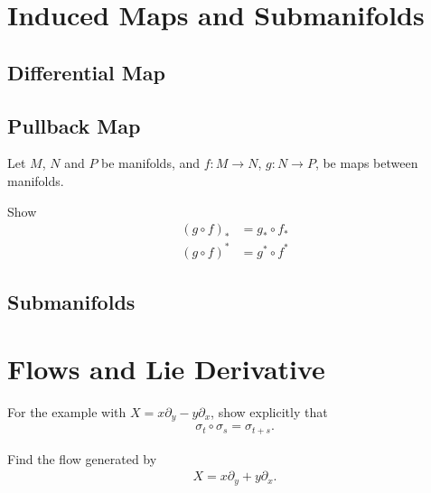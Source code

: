 \section{Induced Maps and Submanifolds}

\subsection{Differential Map}

\subsection{Pullback Map}

\begin{Ebox}
  Let $M$, $N$ and $P$ be manifolds, and $ f:M\to N$, $g:N\to P$,  be maps between manifolds. 

  Show
  \begin{align*}
    (g\circ f)_* &= g_*\circ f_*\\
    (g\circ f)^* &= g^*\circ f^*
  \end{align*}
\end{Ebox}

\subsection{Submanifolds}

\section{Flows and Lie Derivative}

\begin{Ebox}
  For the example with $X=x\partial_y -y\partial_x$, show explicitly that 
  \begin{align}
    \sigma_t\circ \sigma_s = \sigma_{t+s}.
  \end{align}
\end{Ebox}


\begin{Ebox}
  Find the flow generated by
  \begin{align}
    X = x\partial_y +y\partial_x.
  \end{align}
\end{Ebox}

